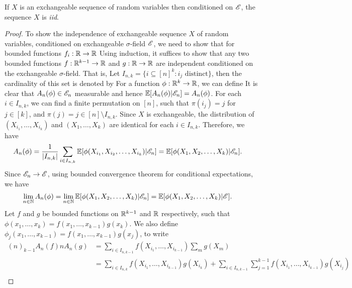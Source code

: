 \documentclass[a4paper,english,10pt]{article}
\begin{document}
\begin{thm} 
If $X$ is an exchangeable sequence of random variables then conditioned on $\mathscr{E}$, the sequence $X$ is \textit{iid}. 
\end{thm}
\begin{proof} 
To show the independence of exchangeable sequence $X$ of random variables, conditioned on exchangeable $\sigma$-field $\mathscr{E}$, 
we need to show that for bounded functions $f_i: \mathbb{R} \to \mathbb{R}$
Using induction, it suffices to show that any two bounded functions $f: \mathbb{R}^{k-1} \to \mathbb{R}$ and $g: \mathbb{R} \to \mathbb{R}$  
are independent conditioned on the exchangeable $\sigma$-field. 
That is, 
Let $I_{n,k} = \{i \subseteq [n]^k: i_j \text{ distinct}\}$, 
then the cardinality of this set is denoted by 
For a function $\phi: \mathbb{R}^k \to \mathbb{R}$, we can define
It is clear that $A_n(\phi) \in \mathscr{E}_n$ measurable and hence $\mathbb{E}[A_n(\phi)|\mathscr{E}_n] = A_n(\phi)$. 
For each $i \in I_{n,k}$, we can find a finite permutation on $[n]$, 
such that $\pi(i_j) = j$ for $j \in [k]$, and $\pi(j) = j \in [n] \setminus I_{n,k}$. 
Since $X$ is exchangeable, the distribution of $(X_{i_1}, \dots, X_{i_k})$ and $(X_1, \dots, X_k)$ are identical for each $i \in I_{n,k}$.  
Therefore, we have
\begin{align*}
A_n(\phi) &= \frac{1}{|I_{n,k}|}\sum_{i \in I_{n,k}}\mathbb{E}[\phi(X_{i_1}, X_{i_2}, \ldots, X_{i_k})|\mathscr{E}_n] = \mathbb{E}[\phi(X_{1}, X_{2}, \ldots, X_{k})|\mathscr{E}_n].
\end{align*}
Since $\mathscr{E}_n \to \mathscr{E}$, using bounded convergence theorem for conditional expectations, we have 
\begin{align*}
\lim_{n \in \mathbb{N}} A_n(\phi) &= \lim_{n \in \mathbb{N}} \mathbb{E}[\phi(X_{1}, X_{2}, \ldots, X_{k})|\mathscr{E}_n] = \mathbb{E}[\phi(X_{1}, X_{2}, \ldots, X_{k})|\mathscr{E}] .
\end{align*}
Let $f$ and $g$ be bounded functions on $\mathbb{R}^{k-1}$ and $\mathbb{R}$ respectively, such that $\phi(x_1,\ldots,x_k) = f(x_1,\ldots,x_{k-1})g(x_k)$. We also define $\phi_j(x_1,\ldots,x_{k-1}) = f(x_1,\ldots,x_{k-1})g(x_j)$, to write 
\begin{align*}
(n)_{k-1}A_n(f)nA_n(g) &= \sum_{i \in I_{n,k-1}}f(X_{i_1}, \ldots,X_{i_{k-1}})\sum_{m}g(X_{m})\\
&= \sum_{i \in I_{n,k}}f(X_{i_1}, \ldots,X_{i_{k-1}})g(X_{i_k}) + \sum_{i \in I_{n,k-1}}\sum_{j=1}^{k-1}f(X_{i_1},\ldots,X_{i_{k-1}})g(X_{i_j})\\

\end{align*}
\end{proof}
\end{document}
